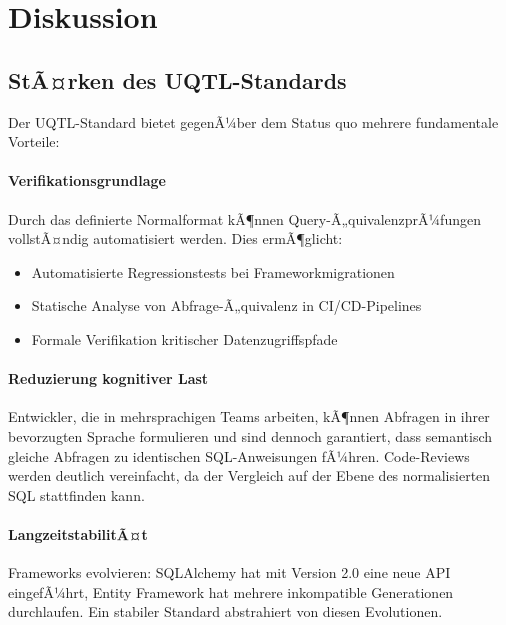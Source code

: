 ﻿%
\section{Diskussion}
\label{sec:diskussion}

\subsection{StÃ¤rken des UQTL-Standards}
\label{subsec:staerken}

Der UQTL-Standard bietet gegenÃ¼ber dem Status quo mehrere fundamentale
Vorteile:

\paragraph{Verifikationsgrundlage}
Durch das definierte Normalformat kÃ¶nnen Query-Ã„quivalenz\-prÃ¼fungen vollstÃ¤ndig
automatisiert werden. Dies ermÃ¶glicht:
\begin{itemize}[leftmargin=1.5cm]
  \item Automatisierte Regressionstests bei Frameworkmigrationen
  \item Statische Analyse von Abfrage-Ã„quivalenz in CI/CD-Pipelines
  \item Formale Verifikation kritischer Datenzugriffspfade
\end{itemize}

\paragraph{Reduzierung kognitiver Last}
Entwickler, die in mehrsprachigen Teams arbeiten, kÃ¶nnen Abfragen in ihrer
bevorzugten Sprache formulieren und sind dennoch garantiert, dass semantisch
gleiche Abfragen zu identischen SQL-Anweisungen fÃ¼hren. Code-Reviews werden
deutlich vereinfacht, da der Vergleich auf der Ebene des normalisierten SQL
stattfinden kann.

\paragraph{LangzeitstabilitÃ¤t}
Frameworks evolvieren: SQLAlchemy hat mit Version 2.0 eine neue API eingefÃ¼hrt,
Entity Framework hat mehrere inkompatible Generationen durchlaufen. Ein
stabiler Standard abstrahiert von diesen Evolutionen.

